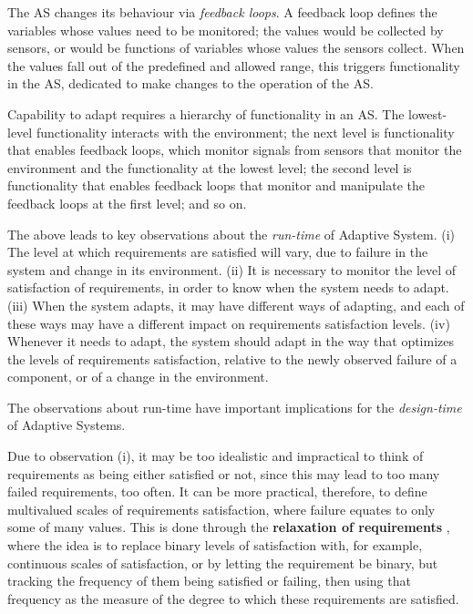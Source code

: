 \documentclass[graybox]{svmult}
\newcommand{\zi}[1]{\textit{#1}}
\newcommand{\xb}[1]{\textbf{#1}}
\newcommand{\ASfull}{Adaptive System}
\newcommand{\AS}{AS}
\begin{document}
The \AS{} changes its behaviour via \zi{feedback loops}. A feedback loop defines the variables whose values need to be monitored; the values would be collected by sensors, or would be functions of variables whose values the sensors collect. When the values fall out of the predefined and allowed range, this triggers functionality in the \AS, dedicated to make changes to the operation of the \AS.

Capability to adapt requires a hierarchy of functionality in an \AS. The lowest-level functionality interacts with the environment; the next level is functionality that enables feedback loops, which monitor signals from sensors that monitor the environment and the functionality at the lowest level; the second level is functionality that enables feedback loops that monitor and manipulate the feedback loops at the first level; and so on.

The above leads to key observations about the \zi{run-time} of \ASfull. (i) The level at which requirements are satisfied will vary, due to failure in the system and change in its environment. (ii) It is necessary to monitor the level of satisfaction of requirements, in order to know when the system needs to adapt. (iii) When the system adapts, it may have different ways of adapting, and each of these ways may have a different impact on requirements satisfaction levels. (iv) Whenever it needs to adapt, the system should adapt in the way that optimizes the levels of requirements satisfaction, relative to the newly observed failure of a component, or of a change in the environment.

The observations about run-time have important implications for the \zi{design-time} of \ASfull s.

Due to observation (i), it may be too idealistic and impractical to think of requirements as being either satisfied or not, since this may lead to too many failed requirements, too often. It can be more practical, therefore, to define multivalued scales of requirements satisfaction, where failure equates to only some of many values. This is done through the \xb{relaxation of requirements} \cite{letier2004reasoning, whittle2009relax, baresi2010fuzzy}, where the idea is to replace binary levels of satisfaction with, for example, continuous scales of satisfaction, or by letting the requirement be binary, but tracking the frequency of them being satisfied or failing, then using that frequency as the measure of the degree to which these requirements are satisfied. 
\end{document}
